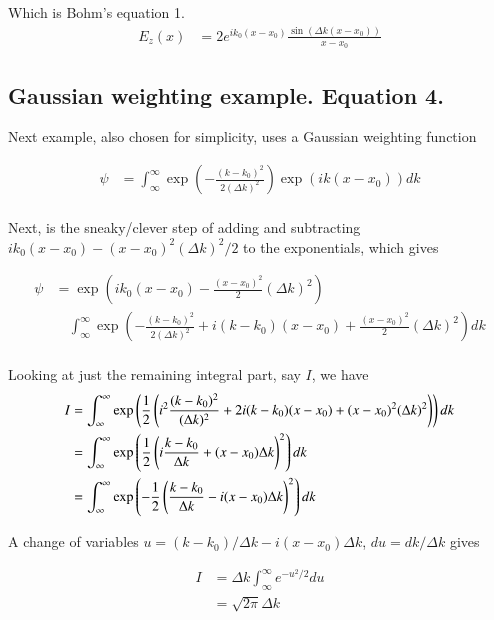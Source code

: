 Which is Bohm's equation 1.
\begin{align*}
E_z(x) &= 2 {e^{i k_0 (x-x_0)}} \frac{\sin( \Delta k (x-x_0))}{ x-x_0}
\end{align*}

\subsection{Gaussian weighting example. Equation 4. }

Next example, also chosen for simplicity, uses a Gaussian weighting function

\begin{align*}
\psi 
&= \int_\infty^\infty 
\exp\left( - \frac{(k-k_0)^2}{2(\Delta k)^2} \right)
\exp\left( i k(x-x_0) \right) dk \\
\end{align*}

Next, is the sneaky/clever step of adding and subtracting $i k_0 (x-x_0) - (x-x_0)^2 (\Delta k)^2/2$ to the exponentials, which gives

\begin{align*}
\psi 
&= 
\exp\left( i k_0 (x-x_0) - \frac{(x-x_0)^2}{2} (\Delta k)^2 \right) \\
&\quad \int_\infty^\infty 
\exp\left( 
- \frac{(k-k_0)^2}{2(\Delta k)^2} 
+i (k-k_0)(x-x_0) 
+\frac{(x-x_0)^2}{2} (\Delta k)^2 
\right) 
dk \\
\end{align*}

Looking at just the remaining integral part, say $I$, we have
\begin{align*}
I &= 
\int_\infty^\infty 
\exp\left( \frac{1}{2} \left(
i^2 \frac{(k-k_0)^2}{(\Delta k)^2} 
+2i (k-k_0)(x-x_0) 
+{(x-x_0)^2}{} (\Delta k)^2 
\right)
\right) 
dk \\
&= 
\int_\infty^\infty 
\exp\left( \frac{1}{2} \left(
i \frac{k-k_0}{\Delta k} 
+(x-x_0) \Delta k
\right)^2
\right) 
dk \\
&= 
\int_\infty^\infty 
\exp\left( -\frac{1}{2} \left(
\frac{k-k_0}{\Delta k} 
-i(x-x_0) \Delta k
\right)^2
\right) 
dk \\
\end{align*}

A change of variables $u = (k-k_0)/{\Delta k} -i(x-x_0) \Delta k$, $du = dk/{\Delta k}$ gives 

\begin{align*}
I 
&= \Delta k \int_\infty^\infty e^{ -u^2/2 } du \\
&= \sqrt{2 \pi} \Delta k 
\end{align*}

